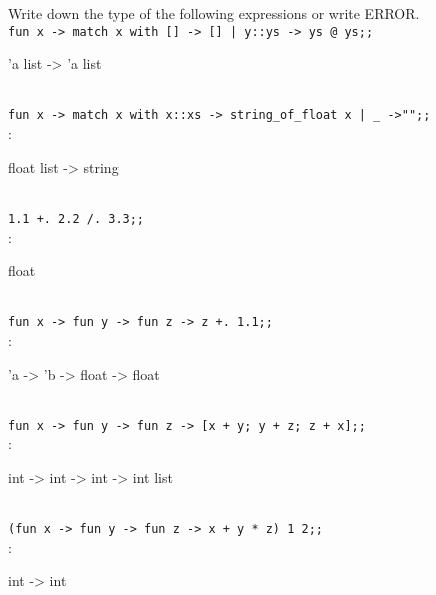 

\renewcommand\AUTHOR{nweadick1@cougars.ccis.edu} %


\topmattertwo

Write down the type of the following expressions or write ERROR.
\nextq
\\
\verb!fun x -> match x with [] -> [] | y::ys -> ys @ ys;;!
\\
\ANSWER
\begin{answerlong}
'a list -> 'a list
\end{answerlong}

\nextq
\\
\verb!fun x -> match x with x::xs -> string_of_float x | _ ->"";;!
\\
\ANSWER:
\begin{answerlong}
float list -> string
\end{answerlong}

\nextq
\\
\verb!1.1 +. 2.2 /. 3.3;;!
\\
\ANSWER:
\begin{answerlong}
float
\end{answerlong}

\nextq
\\
\verb!fun x -> fun y -> fun z -> z +. 1.1;;!
\\
\ANSWER:
\begin{answerlong}
'a -> 'b -> float -> float
\end{answerlong}

\nextq
\\
\verb!fun x -> fun y -> fun z -> [x + y; y + z; z + x];;!
\\
\ANSWER:
\begin{answerlong}
int -> int -> int -> int list
\end{answerlong}

\nextq
\\
\verb!(fun x -> fun y -> fun z -> x + y * z) 1 2;;!
\\
\ANSWER:
\begin{answerlong}
int -> int
\end{answerlong}

